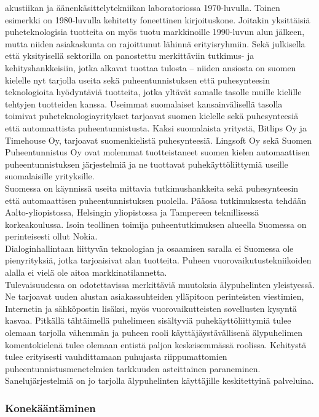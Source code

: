 \begin{multicols}{2}
akustiikan ja äänenkäsittelytekniikan laboratoriossa 1970-luvulla. Toinen esimerkki on 
1980-luvulla kehitetty foneettinen kirjoituskone. Joitakin yksittäisiä
puheteknologisia tuotteita on myös tuotu markkinoille 1990-luvun alun
jälkeen, mutta niiden asiakaskunta on rajoittunut lähinnä
erityisryhmiin. Sekä julkisella että yksityisellä sektorilla on panostettu 
merkittäviin tutkimus- ja kehityshankkeisiin, jotka alkavat tuottaa tulosta 
– niiden ansiosta on suomen kielelle
nyt tarjolla useita sekä puheentunnistuksen että puhesynteesin
teknologioita hyödyntäviä tuotteita, jotka yltävät samalle tasolle
muille kielille tehtyjen tuotteiden kanssa. Useimmat suomalaiset
kansainvälisellä tasolla toimivat puheteknologiayritykset tarjoavat
suomen kielelle sekä puhesynteesiä että automaattista
puheentunnistusta. Kaksi suomalaista yritystä, Bitlips Oy ja Timehouse
Oy, tarjoavat suomenkielistä puhesynteesiä. Lingsoft Oy sekä Suomen
Puheentunnistus Oy ovat molemmat tuotteistaneet suomen kielen
automaattisen puheentunnistuksen järjestelmiä ja ne tuottavat
puhekäyttöliittymiä useille suomalaisille yrityksille.\\
Suomessa on käynnissä useita mittavia tutkimushankkeita sekä
puhesynteesin että automaattisen puheentunnistuksen puolella. Pääosa
tutkimuksesta tehdään Aalto-yliopistossa, Helsingin yliopistossa ja
Tampereen teknillisessä korkeakoulussa. Isoin teollinen toimija
puheentutkimuksen alueella Suomessa on perinteisesti ollut Nokia.\\
Dialoginhallintaan liittyvän teknologian ja osaamisen saralla ei
Suomessa ole pienyrityksiä, jotka tarjoaisivat alan tuotteita. Puheen
vuorovaikutustekniikoiden alalla ei vielä ole aitoa markkinatilannetta.\\
Tulevaisuudessa on odotettavissa merkittäviä muutoksia älypuhelinten
yleistyessä. Ne tarjoavat uuden alustan asiakassuhteiden
ylläpitoon perinteisten viestimien, Internetin ja sähköpostin
lisäksi, myös vuorovaikutteisten sovellusten kysyntä kasvaa. Pitkällä tähtäimellä
puhelimeen sisältyviä puhekäyttöliittymiä tulee olemaan tarjolla
vähemmän ja puheen rooli käyttäjäystävällisenä älypuhelimen
komentokielenä tulee olemaan entistä paljon keskeisemmässä
roolissa. Kehitystä tulee erityisesti vauhdittamaan puhujasta
riippumattomien puheentunnistusmenetelmien tarkkuuden asteittainen
paraneminen.  Sanelujärjestelmiä on jo tarjolla älypuhelinten
käyttäjille keskitettyinä palveluina.


\subsubsection{Konekääntäminen}


\end{multicols}
